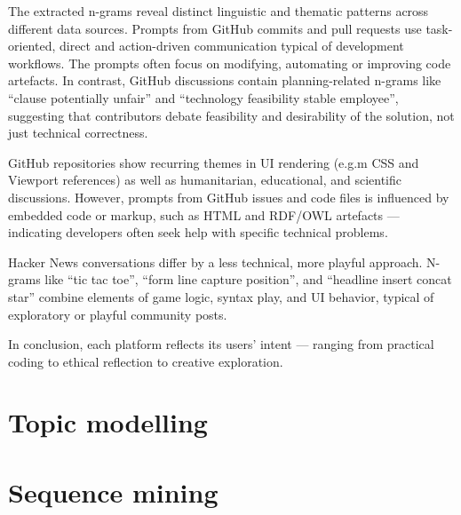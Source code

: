 The extracted n-grams reveal distinct linguistic and thematic patterns across different data sources. Prompts from GitHub commits and pull requests use task-oriented, direct and action-driven communication typical of development workflows. The prompts often focus on modifying, automating or improving code artefacts. In contrast, GitHub discussions contain  planning-related n-grams like ``clause potentially unfair'' and ``technology feasibility stable employee'', suggesting that contributors debate feasibility and desirability of the solution, not just technical correctness. 

GitHub repositories show recurring themes in UI rendering (e.g.m CSS and Viewport references) as well as humanitarian, educational, and scientific discussions. However, prompts from GitHub issues and code files is influenced by embedded code or markup, such as HTML and RDF/OWL artefacts --- indicating developers often seek help with specific technical problems.

Hacker News conversations differ by a less technical, more playful approach. N-grams like ``tic tac toe'', ``form line capture position'', and ``headline insert concat star'' combine elements of game logic, syntax play, and UI behavior, typical of exploratory or playful community posts.

In conclusion, each platform reflects its users’ intent --- ranging from practical coding to ethical reflection to creative exploration.

\section{Topic modelling}

\section{Sequence mining}
